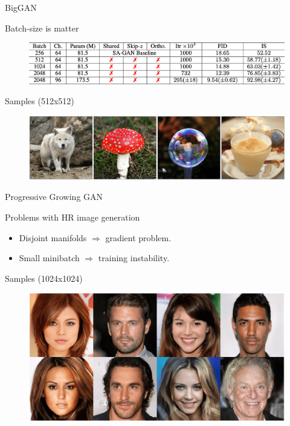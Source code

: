 \documentclass{beamer}
\begin{document}
\begin{frame}{BigGAN}
	\begin{block}{Batch-size is matter}
		\begin{figure}
			\centering
			\includegraphics[width=\linewidth]{figs/biggan_results}
		\end{figure}
	\end{block}
	\begin{block}{Samples (512x512)}
		\begin{figure}
			\centering
			\includegraphics[width=\linewidth]{figs/biggan_samples}
		\end{figure}
	\end{block}
	\vspace{-0.4cm}
\end{frame}
\begin{frame}{Progressive Growing GAN}
	\begin{block}{Problems with HR image generation}
		\begin{itemize}
			\item Disjoint manifolds $\Rightarrow$ gradient problem.
			\item Small minibatch $\Rightarrow$ training instability.
		\end{itemize}
	\end{block}
	\vspace{-0.2cm}
	\begin{block}{Samples (1024x1024)}
		\vspace{-0.2cm}
		\begin{figure}
			\includegraphics[width=0.9\linewidth]{figs/pggan_samples}
		\end{figure}
	\end{block}
\end{frame}
\end{document}
